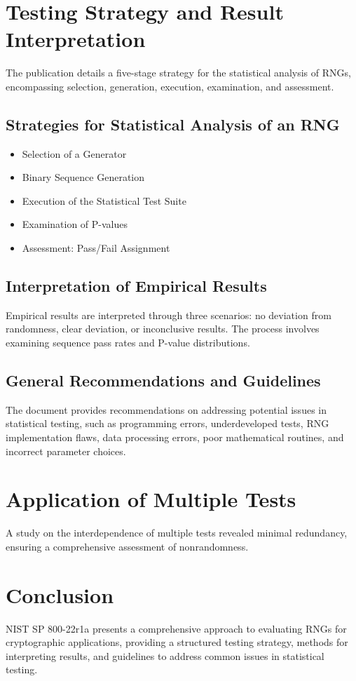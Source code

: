 \documentclass[12pt,openany]{book}
\theoremstyle{definition}
\begin{document}
	\newpage
	\section{Testing Strategy and Result Interpretation}
	The publication details a five-stage strategy for the statistical analysis of RNGs, encompassing selection, generation, execution, examination, and assessment.
	
	\subsection{Strategies for Statistical Analysis of an RNG}
	\begin{itemize}
		\item Selection of a Generator
		\item Binary Sequence Generation
		\item Execution of the Statistical Test Suite
		\item Examination of P-values
		\item Assessment: Pass/Fail Assignment
	\end{itemize}
	
	\subsection{Interpretation of Empirical Results}
	Empirical results are interpreted through three scenarios: no deviation from randomness, clear deviation, or inconclusive results. The process involves examining sequence pass rates and P-value distributions.
	
	\subsection{General Recommendations and Guidelines}
	The document provides recommendations on addressing potential issues in statistical testing, such as programming errors, underdeveloped tests, RNG implementation flaws, data processing errors, poor mathematical routines, and incorrect parameter choices.
	
	\section{Application of Multiple Tests}
	A study on the interdependence of multiple tests revealed minimal redundancy, ensuring a comprehensive assessment of nonrandomness.
	
	\section{Conclusion}
	NIST SP 800-22r1a presents a comprehensive approach to evaluating RNGs for cryptographic applications, providing a structured testing strategy, methods for interpreting results, and guidelines to address common issues in statistical testing.
	
\end{document}
